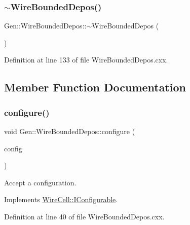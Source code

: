 \subsubsection{\texorpdfstring{$\sim$\+Wire\+Bounded\+Depos()}{~WireBoundedDepos()}}
{\footnotesize\ttfamily Gen\+::\+Wire\+Bounded\+Depos\+::$\sim$\+Wire\+Bounded\+Depos (\begin{DoxyParamCaption}{ }\end{DoxyParamCaption})\hspace{0.3cm}{\ttfamily [virtual]}}



Definition at line 133 of file Wire\+Bounded\+Depos.\+cxx.



\subsection{Member Function Documentation}
\mbox{\label{class_wire_cell_1_1_gen_1_1_wire_bounded_depos_a8a5d8c2f944879a83ae1bd663c615e03}} 
\subsubsection{\texorpdfstring{configure()}{configure()}}
{\footnotesize\ttfamily void Gen\+::\+Wire\+Bounded\+Depos\+::configure (\begin{DoxyParamCaption}\item[{const \hyperlink{namespace_wire_cell_a9f705541fc1d46c608b3d32c182333ee}{Wire\+Cell\+::\+Configuration} \&}]{config }\end{DoxyParamCaption})\hspace{0.3cm}{\ttfamily [virtual]}}



Accept a configuration. 



Implements \hyperlink{class_wire_cell_1_1_i_configurable_a57ff687923a724093df3de59c6ff237d}{Wire\+Cell\+::\+I\+Configurable}.



Definition at line 40 of file Wire\+Bounded\+Depos.\+cxx.

\mbox{\label{class_wire_cell_1_1_gen_1_1_wire_bounded_depos_a310a7a83ec08bbe1efb5543bff582ae7}} 
